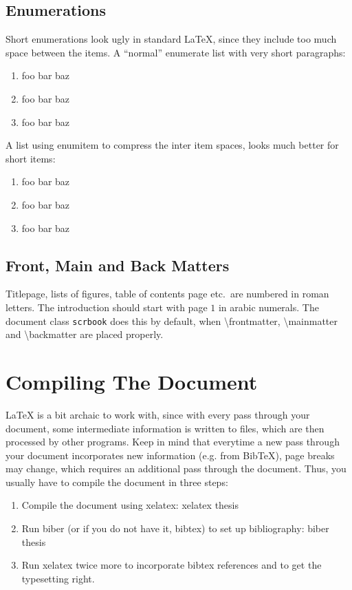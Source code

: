 \documentclass[../{{cookiecutter.project_slug}}.tex]{subfiles}
\begin{document}
    \subsection{Enumerations}

    Short enumerations look ugly in  standard \LaTeX{}, since they include 
    too much  space between the  items.  A ``normal'' enumerate  list with 
    very short paragraphs:                                                 
    \begin{enumerate}
        \item foo bar baz
        \item foo bar baz
        \item foo bar baz
    \end{enumerate}

    A list using enumitem to compress the inter item spaces, looks much better for short items:
    \begin{enumerate}[noitemsep]
        \item foo bar baz
        \item foo bar baz
        \item foo bar baz
    \end{enumerate}

    \subsection{Front, Main and Back Matters}

    Titlepage, lists of figures, table of contents page etc.\ are numbered 
    in  roman letters.   The introduction  should start  with page  $1$ in 
    arabic  numerals.   The document  class  \verb+scrbook+  does this  by 
    default,  when \textbackslash  frontmatter, \textbackslash  mainmatter 
    and \textbackslash backmatter are placed properly.                     



    \section{Compiling The Document}
    \LaTeX{}  is  a bit  archaic  to  work  with,  since with  every  pass 
    through  your document,  some intermediate  information is  written to 
    files,  which are  then processed  by  other programs.   Keep in  mind 
    that  everytime a  new  pass through  your  document incorporates  new 
    information (e.g. from BibTeX), page breaks may change, which requires
    an  additional pass  through the  document. Thus, you  usually have  to
    compile the document in three steps:
    \begin{enumerate}
        \item Compile the document using xelatex: xelatex thesis
        \item Run biber  (or if  you do  not have  it, bibtex)  to set  up
              bibliography: biber thesis
        \item Run xelatex  twice more to incorporate  bibtex references and
              to get the typesetting right.
    \end{enumerate}
\end{document}
